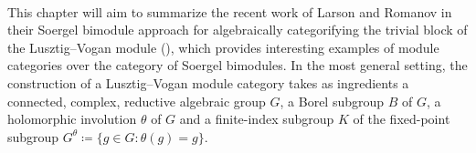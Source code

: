 \noindent 

\newpage

\noindent\\ This chapter will aim to summarize the recent work of Larson and Romanov in their Soergel bimodule approach for algebraically categorifying the trivial block of the Lusztig--Vogan module (\cite{LR22}), which provides interesting examples of module categories over the category of Soergel bimodules. In the most general setting, the construction of a Lusztig--Vogan module category takes as ingredients a connected, complex, reductive algebraic group $G$, a Borel subgroup $B$ of $G$, a holomorphic involution $\theta$ of $G$ and a finite-index subgroup $K$ of the fixed-point subgroup $G^\theta \coloneqq \{g \in G : \theta(g) = g\}$.\\

